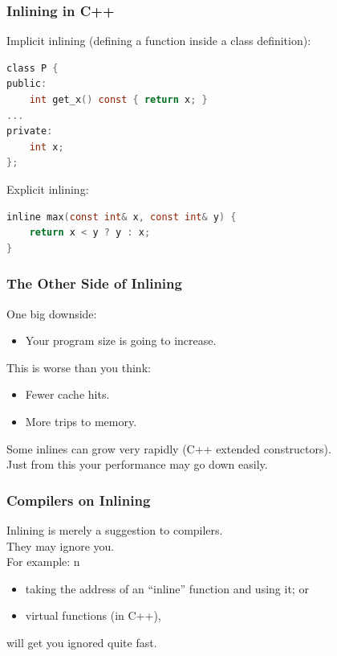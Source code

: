 \begin{frame}[fragile]
  \frametitle{Inlining in C++}

  
  Implicit inlining (defining a function inside a class definition):
  \begin{lstlisting}[language=C]
class P {
public:
    int get_x() const { return x; }
...
private:
    int x;
};
  \end{lstlisting}
  \vfill
Explicit inlining:
  \begin{lstlisting}[language=C]
inline max(const int& x, const int& y) {
    return x < y ? y : x;
}
  \end{lstlisting}
  
\end{frame}

\begin{frame}
  \frametitle{The Other Side of Inlining}

  

  One big downside:
  \begin{itemize}
    \item Your program size is going to increase.
  \end{itemize}
   This is worse than you think:
      \begin{itemize}
        \item Fewer cache hits.
        \item More trips to memory.
      \end{itemize}
   Some inlines can grow very rapidly (C++ extended constructors).\\[1em]
  Just from this your performance may go down easily.
  
\end{frame}

\begin{frame}
  \frametitle{Compilers on Inlining}

  

  Inlining is merely a suggestion to compilers.\\
  They may ignore you.\\[1em]

  For example:
n  \begin{itemize}
    \item taking the address of an ``inline'' function and using it; or
    \item virtual functions (in C++),
  \end{itemize}
  will get you ignored quite fast.
  
\end{frame}

